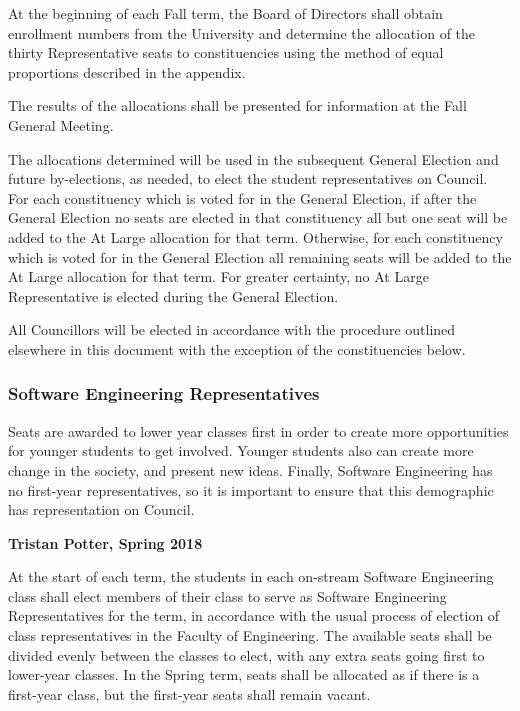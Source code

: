 At the beginning of each Fall term, the Board of Directors shall obtain 
enrollment numbers from the University and determine the allocation of the
thirty Representative seats to constituencies using the method of equal
proportions described in the appendix.

The results of the allocations shall be presented for information at the 
Fall General Meeting.

The allocations determined will be used in the subsequent General Election and
future by-elections, as needed, to elect the student representatives on
Council. For each constituency which is voted for in the General Election, if 
after the General Election no seats are elected in that constituency all but 
one seat will be added to the At Large allocation for that term. Otherwise,
for each constituency which is voted for in the General Election all remaining
seats will be added to the At Large allocation for that term. For greater certainty,
no At Large Representative is elected during the General Election. 


All Councillors will be elected in accordance with the procedure outlined
elsewhere in this document with the exception of the constituencies below.

\subsubsection{Software Engineering Representatives}
\begin{annotation}
    Seats are awarded to lower year classes first in order to create more
    opportunities for younger students to get involved. Younger students also
    can create more change in the society, and present new ideas. Finally,
    Software Engineering has no first-year representatives, so it is important
    to ensure that this demographic has representation on Council.
    
    \textbf{Tristan Potter, Spring 2018}
\end{annotation}

At the start of each term, the students in each on-stream Software Engineering
class shall elect members of their class to serve as Software Engineering
Representatives for the term, in accordance with the usual process of election
of class representatives in the Faculty of Engineering. The available seats
shall be divided evenly between the classes to elect, with any extra seats going
first to lower-year classes. In the Spring term, seats shall be allocated as if
there is a first-year class, but the first-year seats shall remain vacant.

